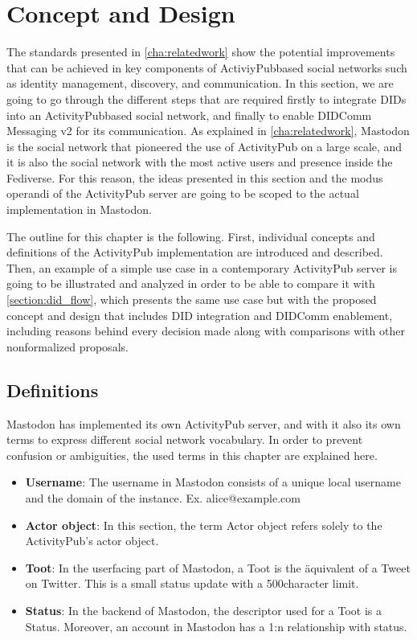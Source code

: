 \chapter{Concept and Design}
\label{cha:conceptanddesign}
 
The standards presented in \autoref{cha:relatedwork} show the potential improvements that can be achieved in key components of ActiviyPub\-based social networks such as identity management, discovery, and communication. In this section, we are going to go through the different steps that are required firstly to integrate DIDs into an ActivityPub\-based social network, and finally to enable DIDComm Messaging v2 for its communication. As explained in \autoref{cha:relatedwork}, Mastodon is the social network that pioneered the use of ActivityPub on a large scale, and it is also the social network with the most active users and presence inside the Fediverse. For this reason, the ideas presented in this section and the modus operandi of the ActivityPub server are going to be scoped to the actual implementation in Mastodon.

The outline for this chapter is the following. First, individual concepts and definitions of the ActivityPub implementation are introduced and described. Then, an example of a simple use case in a contemporary ActivityPub server is going to be illustrated and analyzed in order to be able to compare it with \autoref{section:did_flow}, which presents the same use case but with the proposed concept and design that includes DID integration and DIDComm enablement, including reasons behind every decision made along with comparisons with other non\-formalized proposals.
 
\section{Definitions}
Mastodon has implemented its own ActivityPub server, and with it also its own terms to express different social network vocabulary. In order to prevent confusion or ambiguities, the used terms in this chapter are explained here. 
 
\begin{itemize}
  \item \textbf{Username}: The username in Mastodon consists of a unique local username and the domain of the instance. Ex. alice@example.com
  \item \textbf{Actor object}: In this section, the term Actor object refers solely to the ActivityPub's actor object. 
  \item \textbf{Toot}: In the user\-facing part of Mastodon, a Toot is the äquivalent of a Tweet on Twitter. This is a small status update with a 500\-character limit.
  \item \textbf{Status}: In the backend of Mastodon, the descriptor used for a Toot is a Status. Moreover, an account in Mastodon has a 1:n relationship with status.
\end{itemize}

